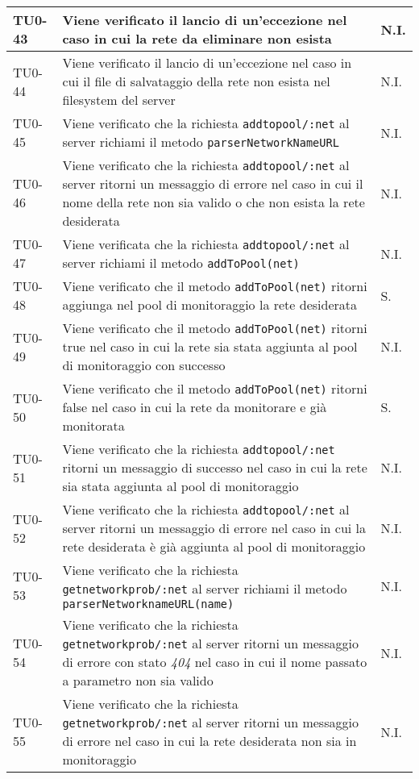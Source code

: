 \begin{longtable}{|C{.15\textwidth}|m{.66\textwidth}|C{.10\textwidth}|}
 \hline
{}TU0-43 & Viene verificato il lancio di un'eccezione nel caso in cui la rete da eliminare non esista & N.I. \\ 
\hline
 TU0-44 & Viene verificato il lancio di un'eccezione nel caso in cui il file di salvataggio della rete non esista nel filesystem del server & N.I. \\ 
 \hline
  TU0-45 & Viene verificato che la richiesta \texttt{addtopool/:net} al server richiami il metodo \texttt{parserNetworkNameURL} & N.I. \\ 
 \hline
 TU0-46 & Viene verificato che la richiesta \texttt{addtopool/:net} al server ritorni un messaggio di errore nel caso in cui il nome della rete non sia valido o che non esista la rete desiderata & N.I. \\ 
 \hline
 TU0-47 & Viene verificata che la richiesta \texttt{addtopool/:net} al server richiami il metodo \texttt{addToPool(net)} & N.I. \\ 
 \hline
 TU0-48 & Viene verificato che il metodo \texttt{addToPool(net)} ritorni aggiunga nel pool di monitoraggio la rete desiderata & S. \\
\hline
{} TU0-49 & Viene verificato che il metodo \texttt{addToPool(net)} ritorni true nel caso in cui la rete sia stata aggiunta al pool di monitoraggio con successo & N.I. \\ 
\hline 
TU0-50 & Viene verificato che il metodo \texttt{addToPool(net)} ritorni false nel caso in cui la rete da monitorare e già monitorata & S. \\ 
\hline
{} TU0-51 & Viene verificato che la richiesta \texttt{addtopool/:net} ritorni un messaggio di successo nel caso in cui la rete sia stata aggiunta al pool di monitoraggio & N.I. \\ 
\hline 
TU0-52 & Viene verificato che la richiesta \texttt{addtopool/:net} al server ritorni un messaggio di errore nel caso in cui la rete desiderata è già aggiunta al pool di monitoraggio & N.I. \\ 
\hline 
{} TU0-53 & Viene verificato che la richiesta \texttt{getnetworkprob/:net} al server richiami il metodo \texttt{parserNetworknameURL(name)} &  N.I. \\ 
\hline 
TU0-54 & Viene verificato che la richiesta \texttt{getnetworkprob/:net} al server ritorni un messaggio di errore con stato \textit{404} nel caso in cui il nome passato a parametro non sia valido & N.I. \\ 
\hline
{} TU0-55 & Viene verificato che la richiesta \texttt{getnetworkprob/:net} al server ritorni un messaggio di errore nel caso in cui la rete desiderata non sia in monitoraggio & N.I. \\ 

\end{longtable}

